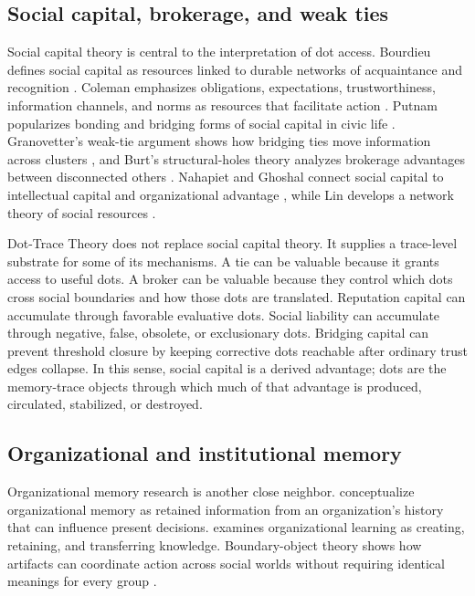 \documentclass[11pt]{article}
\theoremstyle{remark}
\begin{document}
\subsection{Social capital, brokerage, and weak ties}\label{social-capital-brokerage-weak-ties}

Social capital theory is central to the interpretation of dot access. Bourdieu defines social capital as resources linked to durable networks of acquaintance and recognition \citep{bourdieu1986forms}. Coleman emphasizes obligations, expectations, trustworthiness, information channels, and norms as resources that facilitate action \citep{coleman1988social}. Putnam popularizes bonding and bridging forms of social capital in civic life \citep{putnam2000bowling}. Granovetter's weak-tie argument shows how bridging ties move information across clusters \citep{granovetter1973strength}, and Burt's structural-holes theory analyzes brokerage advantages between disconnected others \citep{burt1992structural}. Nahapiet and Ghoshal connect social capital to intellectual capital and organizational advantage \citep{nahapiet1998social}, while Lin develops a network theory of social resources \citep{lin2001social}.

Dot-Trace Theory does not replace social capital theory. It supplies a trace-level substrate for some of its mechanisms. A tie can be valuable because it grants access to useful dots. A broker can be valuable because they control which dots cross social boundaries and how those dots are translated. Reputation capital can accumulate through favorable evaluative dots. Social liability can accumulate through negative, false, obsolete, or exclusionary dots. Bridging capital can prevent threshold closure by keeping corrective dots reachable after ordinary trust edges collapse. In this sense, social capital is a derived advantage; dots are the memory-trace objects through which much of that advantage is produced, circulated, stabilized, or destroyed.

\subsection{Organizational and institutional memory}\label{organizational-institutional-memory}

Organizational memory research is another close neighbor. \citet{walsh1991organizational} conceptualize organizational memory as retained information from an organization's history that can influence present decisions. \citet{argote2013organizational} examines organizational learning as creating, retaining, and transferring knowledge. Boundary-object theory shows how artifacts can coordinate action across social worlds without requiring identical meanings for every group \citep{star1989institutional}.
\end{document}
